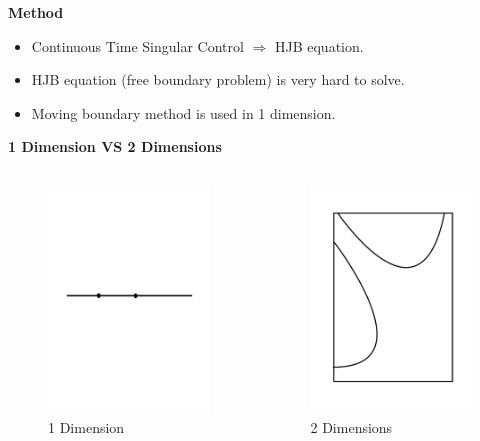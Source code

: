 \documentclass{beamer}
\begin{document}
%
\begin{frame}
{\bf Method}
\begin{itemize}
  \item Continuous Time Singular Control $\Rightarrow$ HJB equation.\\
  \item HJB equation (free boundary problem) is very hard to solve.\\
  \item Moving boundary method is used in 1 dimension.\\
\end{itemize}
\end{frame}
%
\begin{frame}
{\bf 1 Dimension VS 2 Dimensions}
\begin{columns}

   \begin{figure}[hbt]
   \includegraphics[width = 5cm]{1D.pdf}
   \caption{1 Dimension}
   \end{figure}
 
  \begin{figure}[hbt]
  \includegraphics[width = 5cm]{2D1.pdf}
  \caption{2 Dimensions}
  \end{figure}
\end{columns}

\end{frame}
\end{document}
